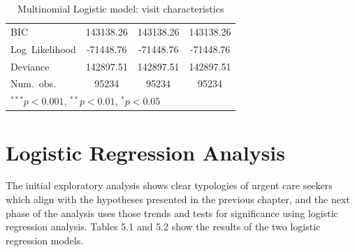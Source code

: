 \documentclass[12pt,twoside]{reedthesis}
\begin{document}
\begin{table}
\begin{center}
\begin{footnotesize}
\begin{tabular}{l c c c }
  BIC                                & 143138.26              & 143138.26              & 143138.26              \\
  Log\ Likelihood                    & -71448.76              & -71448.76              & -71448.76              \\
  Deviance                           & 142897.51              & 142897.51              & 142897.51              \\
  Num.\ obs.                         & 95234                  & 95234                  & 95234                  \\
  \hline
  \multicolumn{4}{l}{\tiny{$^{***}p<0.001$, $^{**}p<0.01$, $^*p<0.05$}}
  \end{tabular}
  \end{footnotesize}
  \caption{Multinomial Logistic model: visit characteristics}
  \label{table:coefficients}
  \end{center}
  \end{table}
  
  \doublespacing
  
  \section*{Logistic Regression
  Analysis}\label{logistic-regression-analysis}
  
  The initial exploratory analysis shows clear typologies of urgent care
  seekers which align with the hypotheses presented in the previous
  chapter, and the next phase of the analysis uses those trends and tests
  for significance using logistic regression analysis. Tables 5.1 and 5.2
  show the results of the two logistic regression models.
  
  \singlespacing
  
\end{document}
